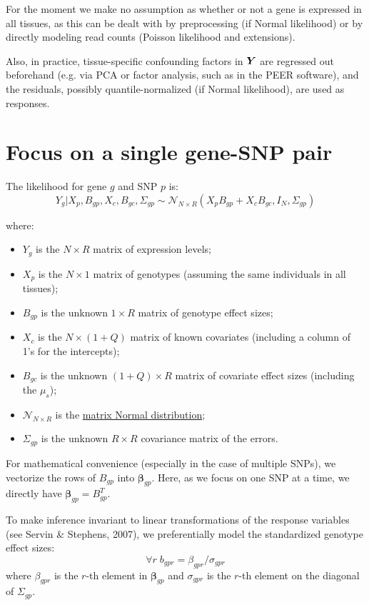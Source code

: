\documentclass[10pt]{article}
\newcommand{\Norm}{{\mathcal{N}}} %
\newcommand{\Yv}{\mbox{\boldmath$Y$}}
\begin{document}
For the moment we make no assumption as whether or not a gene is expressed in all tissues, as this can be dealt with by preprocessing (if Normal likelihood) or by directly modeling read counts (Poisson likelihood and extensions).

Also, in practice, tissue-specific confounding factors in $\Yv$ are regressed out beforehand (e.g. via PCA or factor analysis, such as in the PEER software), and the residuals, possibly quantile-normalized (if Normal likelihood), are used as responses.



\section{Focus on a single gene-SNP pair}

The likelihood for gene $g$ and SNP $p$ is:
\begin{equation}
Y_g | X_p, B_{gp}, X_c, B_{gc}, \Sigma_{gp} \sim \Norm_{N \times R}(X_p B_{gp} + X_c B_{gc}, I_N, \Sigma_{gp})
\end{equation}

where:
\begin{itemize}
\item $Y_g$ is the $N \times R$ matrix of expression levels;
\item $X_p$ is the $N \times 1$ matrix of genotypes (assuming the same individuals in all tissues);
\item $B_{gp}$ is the unknown $1 \times R$ matrix of genotype effect sizes;
\item $X_c$ is the $N \times (1+Q)$ matrix of known covariates (including a column of 1's for the intercepts);
\item $B_{gc}$ is the unknown $(1+Q) \times R$ matrix of covariate effect sizes (including the $\mu_s$);
\item $\Norm_{N \times R}$ is the \href{https://en.wikipedia.org/wiki/Matrix_normal_distribution}{matrix Normal distribution};
\item $\Sigma_{gp}$ is the unknown $R \times R$ covariance matrix of the errors.
\end{itemize}

For mathematical convenience (especially in the case of multiple SNPs), we vectorize the rows of $B_{gp}$ into $\bm{\beta}_{gp}$.
Here, as we focus on one SNP at a time, we directly have $\bm{\beta}_{gp} = B_{gp}^T$.

To make inference invariant to linear transformations of the response variables (see Servin \& Stephens, 2007), we preferentially model the standardized genotype effect sizes:
\[
\forall r \; b_{gpr} = \beta_{gpr} / \sigma_{gpr}
\]
where $\beta_{gpr}$ is the $r$-th element in $\bm{\beta}_{gp}$ and $\sigma_{gpr}$ is the $r$-th element on the diagonal of $\Sigma_{gp}$.
\end{document}
